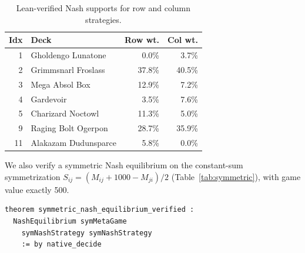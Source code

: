 \documentclass[journal]{IEEEtran}
\begin{document}
\begin{table}[!t]
\centering
\caption{Lean-verified Nash supports for row and column strategies.}
\label{tab:nash}
\scriptsize
\begin{tabular}{@{}rlrr@{}}
\toprule
\textbf{Idx} & \textbf{Deck} & \textbf{Row wt.} & \textbf{Col wt.} \\
\midrule
1 & Gholdengo Lunatone & 0.0\% & 3.7\% \\
2 & Grimmsnarl Froslass & 37.8\% & 40.5\% \\
3 & Mega Absol Box & 12.9\% & 7.2\% \\
4 & Gardevoir & 3.5\% & 7.6\% \\
5 & Charizard Noctowl & 11.3\% & 5.0\% \\
9 & Raging Bolt Ogerpon & 28.7\% & 35.9\% \\
11 & Alakazam Dudunsparce & 5.8\% & 0.0\% \\
\bottomrule
\end{tabular}
\end{table}

We also verify a symmetric Nash equilibrium on the constant-sum symmetrization $S_{ij} = (M_{ij} + 1000 - M_{ji})/2$ (Table~\ref{tab:symmetric}), with game value exactly 500.

\begin{lstlisting}[caption={Machine-checked symmetric Nash equilibrium of the constant-sum symmetrization.},label={lst:symnash}]
theorem symmetric_nash_equilibrium_verified :
  NashEquilibrium symMetaGame
    symNashStrategy symNashStrategy
    := by native_decide
\end{lstlisting}
\end{document}
